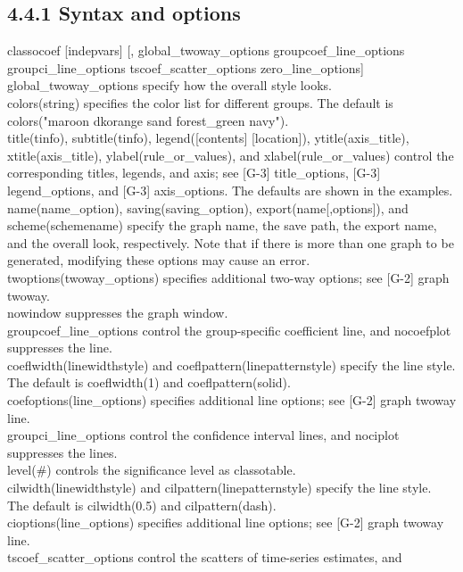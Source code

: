 \documentclass[10pt]{article}
\begin{document}
\subsection*{4.4.1 Syntax and options}
classocoef [indepvars] [, global\_twoway\_options groupcoef\_line\_options groupci\_line\_options tscoef\_scatter\_options zero\_line\_options]\\
global\_twoway\_options specify how the overall style looks.\\
colors(string) specifies the color list for different groups. The default is colors("maroon dkorange sand forest\_green navy").\\[0pt]
title(tinfo), subtitle(tinfo), legend([contents] [location]), ytitle(axis\_title), xtitle(axis\_title), ylabel(rule\_or\_values), and xlabel(rule\_or\_values) control the corresponding titles, legends, and axis; see [G-3] title\_options, [G-3] legend\_options, and [G-3] axis\_options. The defaults are shown in the examples.\\[0pt]
name(name\_option), saving(saving\_option), export(name[,options]), and scheme(schemename) specify the graph name, the save path, the export name, and the overall look, respectively. Note that if there is more than one graph to be generated, modifying these options may cause an error.\\[0pt]
twoptions(twoway\_options) specifies additional two-way options; see [G-2] graph twoway.\\
nowindow suppresses the graph window.\\
groupcoef\_line\_options control the group-specific coefficient line, and nocoefplot suppresses the line.\\
coeflwidth(linewidthstyle) and coeflpattern(linepatternstyle) specify the line style. The default is coeflwidth(1) and coeflpattern(solid).\\[0pt]
coefoptions(line\_options) specifies additional line options; see [G-2] graph twoway line.\\
groupci\_line\_options control the confidence interval lines, and nociplot suppresses the lines.\\
level(\#) controls the significance level as classotable.\\
cilwidth(linewidthstyle) and cilpattern(linepatternstyle) specify the line style. The default is cilwidth(0.5) and cilpattern(dash).\\[0pt]
cioptions(line\_options) specifies additional line options; see [G-2] graph twoway line.\\
tscoef\_scatter\_options control the scatters of time-series estimates, and\\
\end{document}
